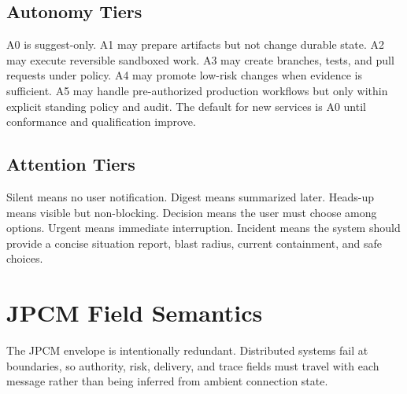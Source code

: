 \documentclass[10pt,journal,onecolumn]{IEEEtran}
\begin{document}
\subsection{Autonomy Tiers}
A0 is suggest-only. A1 may prepare artifacts but not change durable state. A2 may execute reversible sandboxed work. A3 may create branches, tests, and pull requests under policy. A4 may promote low-risk changes when evidence is sufficient. A5 may handle pre-authorized production workflows but only within explicit standing policy and audit. The default for new services is A0 until conformance and qualification improve.

\subsection{Attention Tiers}
Silent means no user notification. Digest means summarized later. Heads-up means visible but non-blocking. Decision means the user must choose among options. Urgent means immediate interruption. Incident means the system should provide a concise situation report, blast radius, current containment, and safe choices.

\section{JPCM Field Semantics}
The JPCM envelope is intentionally redundant. Distributed systems fail at boundaries, so authority, risk, delivery, and trace fields must travel with each message rather than being inferred from ambient connection state.
\end{document}
